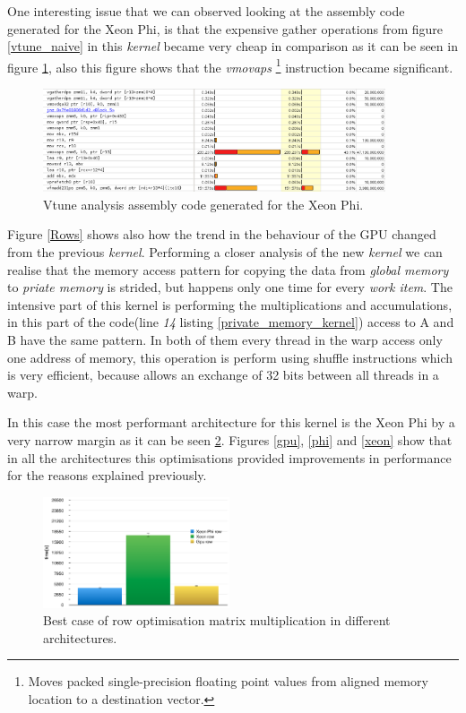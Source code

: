 \par{One interesting issue that we can observed looking at the assembly 
    code generated for the Xeon Phi, is that the 
    expensive gather operations from figure \ref{vtune_naive} in this 
    \emph{kernel} became very cheap in comparison as it can
    be seen in figure \ref{vtune_rows}, also this figure shows that the 
    \emph{vmovaps} \footnote{Moves packed single-precision 
    floating point values from aligned memory location to a destination 
    vector\cite{intrinsics}.} instruction became significant.}

\begin{figure}[!h]
    \centering
    \includegraphics[width=0.9\textwidth]{figures/vtune_rows.png}
    \caption{Vtune analysis assembly code generated for the Xeon Phi.}
    \label{vtune_rows}
\end{figure}

\par{Figure \ref{Rows} shows also how the trend in the behaviour of the GPU
    changed from the previous \emph{kernel}. Performing a closer analysis of the
    new \emph{kernel} we can realise that the memory access pattern for copying
    the data from \emph{global memory} to \emph{priate memory} is strided, but
    happens only one time for every \emph{work item}. The intensive part of
    this kernel is performing the multiplications and accumulations, in this 
    part of the code(line \emph{14} listing \ref{private_memory_kernel}) 
    access to A and B have the same pattern. In both of them every thread in
    the warp access only one address of memory, this operation is perform using
    shuffle instructions which is very efficient, because  allows an exchange of
    32 bits between all threads in a warp\cite{broadcast}.}



\par{In this case the most performant architecture for this kernel is the 
    Xeon Phi by a very narrow margin as it can be seen \ref{RowRes}. Figures
    \ref{gpu}, \ref{phi} and \ref{xeon} show that in all the architectures this
    optimisations provided improvements in performance for the reasons explained
    previously.}

\begin{figure}[!h]
    \centering
    \includegraphics[width=0.49\textwidth]{figures/rowRes.png}
    \caption{Best case of row optimisation matrix multiplication in different architectures.}
    \label{RowRes}
\end{figure}



